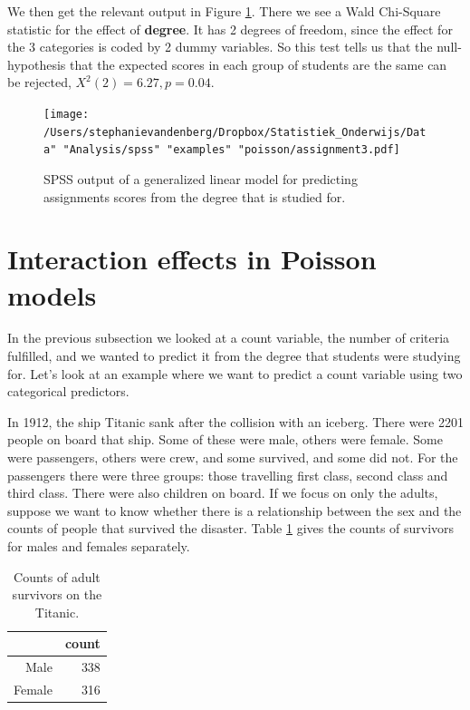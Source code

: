 \documentclass[]{book}\usepackage[]{graphicx}\usepackage[]{color}
\begin{document}
We then get the relevant output in Figure \ref{fig:assignment3}. There we see a Wald Chi-Square statistic for the effect of \textbf{degree}. It has 2 degrees of freedom, since the effect for the 3 categories is coded by 2 dummy variables. So this test tells us that the null-hypothesis that the expected scores in each group of students are the same can be rejected, $X^2(2)=6.27, p=0.04$.


\begin{figure}[h]
    \begin{center}
       \texttt{[image: /Users/stephanievandenberg/Dropbox/Statistiek\_Onderwijs/Data" "Analysis/spss" "examples" "poisson/assignment3.pdf]}
    \end{center}
     \caption{SPSS output of a generalized linear model for predicting assignments scores from the degree that is studied for.}
    \label{fig:assignment3}
\end{figure}


\section{Interaction effects in Poisson models}

In the previous subsection we looked at a count variable, the number of criteria fulfilled, and we wanted to predict it from the degree that students were studying for. Let's look at an example where we want to predict a count variable using two categorical predictors.

In 1912, the ship Titanic sank after the collision with an iceberg. There were 2201 people on board that ship. Some of these were male, others were female. Some were passengers, others were crew, and some survived, and some did not. For the passengers there were three groups: those travelling first class, second class and third class. There were also children on board. If we focus on only the adults, suppose we want to know whether there is a relationship between the sex and the counts of people that survived the disaster. Table \ref{tab:gen_20} gives the counts of survivors for males and females separately.


\begin{table}[ht]
\centering
\caption{Counts of adult survivors on the Titanic.} 
\label{tab:gen_20}
\begin{tabular}{rr}
  \hline
 & count \\ 
  \hline
Male & 338 \\ 
  Female & 316 \\ 
   \hline
\end{tabular}
\end{table}
\end{document}
